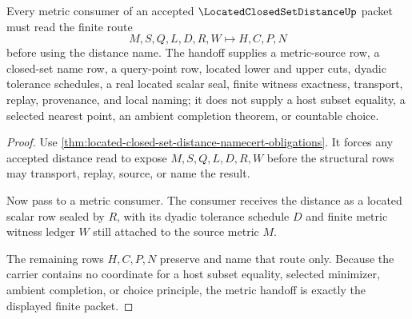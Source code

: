 \begin{theorem}
\label{thm:located-closed-set-distance-metric-handoff}
Every metric consumer of an accepted $\LocatedClosedSetDistanceUp$ packet must read the finite route
$$
M,S,Q,L,D,R,W \longmapsto H,C,P,N
$$
before using the distance name. The handoff supplies a metric-source row, a closed-set name row, a query-point row, located lower and upper cuts, dyadic tolerance schedules, a real located scalar seal, finite witness exactness, transport, replay, provenance, and local naming; it does not supply a host subset equality, a selected nearest point, an ambient completion theorem, or countable choice.
\end{theorem}
\begin{proof}
Use \autoref{thm:located-closed-set-distance-namecert-obligations}. It forces any accepted distance read to expose $M,S,Q,L,D,R,W$ before the structural rows may transport, replay, source, or name the result.

Now pass to a metric consumer. The consumer receives the distance as a located scalar row sealed by $R$, with its dyadic tolerance schedule $D$ and finite metric witness ledger $W$ still attached to the source metric $M$.

The remaining rows $H,C,P,N$ preserve and name that route only. Because the carrier contains no coordinate for a host subset equality, selected minimizer, ambient completion, or choice principle, the metric handoff is exactly the displayed finite packet.
\end{proof}




